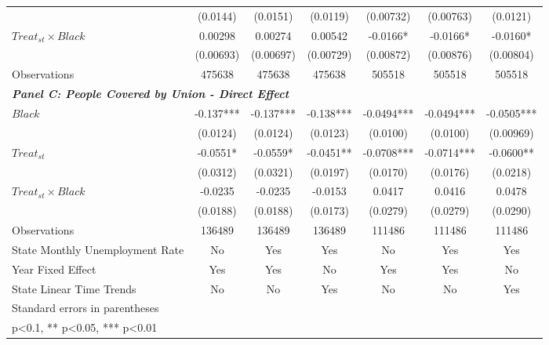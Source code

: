 \begin{table}[ht!]
\begin{tabular}{l*{6}{c}}
&    (0.0144)   &    (0.0151)   &    (0.0119)   &   (0.00732)   &   (0.00763)   &    (0.0121)   \\
[1em]
$ Treat_{st} \times Black $&     0.00298   &     0.00274   &     0.00542   &     -0.0166*  &     -0.0166*  &     -0.0160*  \\
&   (0.00693)   &   (0.00697)   &   (0.00729)   &   (0.00872)   &   (0.00876)   &   (0.00804)   \\
\hline
Observations        &      475638   &      475638   &      475638   &      505518   &      505518   &      505518   \\
\hline
\multicolumn{3}{l}{\linebreak \textbf{\textit{Panel C: People Covered by Union - Direct Effect}}} \\
$ Black $           &      -0.137***&      -0.137***&      -0.138***&     -0.0494***&     -0.0494***&     -0.0505***\\
&    (0.0124)   &    (0.0124)   &    (0.0123)   &    (0.0100)   &    (0.0100)   &   (0.00969)   \\
[1em]
$ Treat_{st} $      &     -0.0551*  &     -0.0559*  &     -0.0451** &     -0.0708***&     -0.0714***&     -0.0600** \\
&    (0.0312)   &    (0.0321)   &    (0.0197)   &    (0.0170)   &    (0.0176)   &    (0.0218)   \\
[1em]
$ Treat_{st} \times Black $&     -0.0235   &     -0.0235   &     -0.0153   &      0.0417   &      0.0416   &      0.0478   \\
&    (0.0188)   &    (0.0188)   &    (0.0173)   &    (0.0279)   &    (0.0279)   &    (0.0290)   \\
\hline
Observations        &      136489   &      136489   &      136489   &      111486   &      111486   &      111486   \\
State Monthly Unemployment Rate&          No   &         Yes   &         Yes   &          No   &         Yes   &         Yes   \\
Year Fixed Effect   &         Yes   &         Yes   &          No   &         Yes   &         Yes   &          No   \\
State Linear Time Trends&          No   &          No   &         Yes   &          No   &          No   &         Yes   \\
\hline\hline
\multicolumn{7}{l}{\footnotesize Standard errors in parentheses}\\
\multicolumn{7}{l}{\footnotesize * p<0.1, ** p<0.05, *** p<0.01}\\
\end{tabular}
\end{table}
